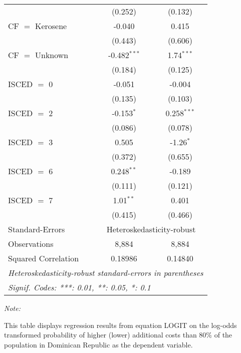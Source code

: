 \begin{table}[htbp!]
\begin{adjustbox}{width = 1\textwidth, max height = 0.95\textheight, center}
\begin{threeparttable}[b]
\begin{tabular}{lcc}
                                 & (0.252)        & (0.132)\\   
            CF $=$ Kerosene      & -0.040         & 0.415\\   
                                 & (0.443)        & (0.606)\\   
            CF $=$ Unknown       & -0.482$^{***}$ & 1.74$^{***}$\\   
                                 & (0.184)        & (0.125)\\   
            ISCED $=$ 0          & -0.051         & -0.004\\   
                                 & (0.135)        & (0.103)\\   
            ISCED $=$ 2          & -0.153$^{*}$   & 0.258$^{***}$\\   
                                 & (0.086)        & (0.078)\\   
            ISCED $=$ 3          & 0.505          & -1.26$^{*}$\\   
                                 & (0.372)        & (0.655)\\   
            ISCED $=$ 6          & 0.248$^{**}$   & -0.189\\   
                                 & (0.111)        & (0.121)\\   
            ISCED $=$ 7          & 1.01$^{**}$    & 0.401\\   
                                 & (0.415)        & (0.466)\\   
            \midrule 
            Standard-Errors & \multicolumn{2}{c}{Heteroskedasticity-robust} \\ 
            Observations         & 8,884          & 8,884\\  
            Squared Correlation  & 0.18986        & 0.14840\\  
            \midrule \midrule
            \multicolumn{3}{l}{\emph{Heteroskedasticity-robust standard-errors in parentheses}}\\
            \multicolumn{3}{l}{\emph{Signif. Codes: ***: 0.01, **: 0.05, *: 0.1}}\\
         \end{tabular}
         
         \begin{tablenotes}\item \medskip \textit{Note:}
            \item This table displays regression results from equation LOGIT on the log-odds transformed probability of higher (lower) additional costs than 80\% of the population in Dominican Republic as the dependent variable. 
         \end{tablenotes}
      \end{threeparttable}
   \end{adjustbox}
\end{table}


